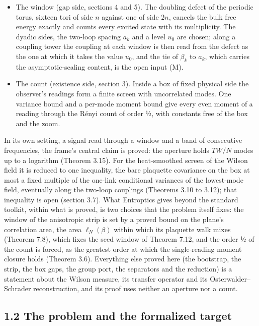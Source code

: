 \documentclass[10pt,letterpaper,twocolumn]{article}
\providecommand{\tightlist}{\setlength{\itemsep}{0pt}\setlength{\parskip}{0pt}}
\begin{document}
\begin{itemize}
\tightlist
\item
  The window (gap side, sections 4 and 5). The doubling defect of the periodic torus, sixteen tori of side \(n\) against one of side \(2n\), cancels the bulk free energy exactly and counts every excited state with its multiplicity. The dyadic sides, the two-loop spacing \(a_k\) and a level \(u_0\) are chosen; along a coupling tower the coupling at each window is then read from the defect as the one at which it takes the value \(u_0\), and the tie of \(\beta_k\) to \(a_k\), which carries the asymptotic-scaling content, is the open input (M).
\item
  The count (existence side, section 3). Inside a box of fixed physical side the observer's readings form a finite screen with uncorrelated modes. One variance bound and a per-mode moment bound give every even moment of a reading through the Rényi count of order ½, with constants free of the box and the zoom.
\end{itemize}

In its own setting, a signal read through a window and a band of consecutive frequencies, the frame's central claim is proved: the aperture holds \(TW/N\) modes up to a logarithm (Theorem 3.15). For the heat-smoothed screen of the Wilson field it is reduced to one inequality, the bare plaquette covariance on the box at most a fixed multiple of the one-link conditional variances of the lowest-mode field, eventually along the two-loop couplings (Theorems 3.10 to 3.12); that inequality is open (section 3.7). What Entroptics gives beyond the standard toolkit, within what is proved, is two choices that the problem itself fixes: the window of the anisotropic strip is set by a proved bound on the plane's correlation area, the area \(\ell_N(\beta)\) within which its plaquette walk mixes (Theorem 7.8), which fixes the seed window of Theorem 7.12, and the order ½ of the count is forced, as the greatest order at which the single-reading moment closure holds (Theorem 3.6). Everything else proved here (the bootstrap, the strip, the box gaps, the group port, the separators and the reduction) is a statement about the Wilson measure, its transfer operator and its Osterwalder--Schrader reconstruction, and its proof uses neither an aperture nor a count.

\subsection{1.2 The problem and the formalized target}\label{12-the-problem-and-the-formalized-target}
\end{document}
